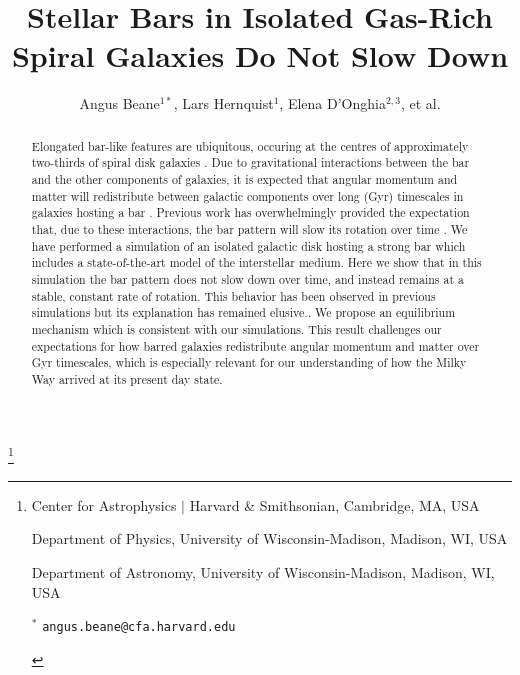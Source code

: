 \documentclass{natureprintstyle}
\title{Stellar Bars in Isolated Gas-Rich Spiral Galaxies Do Not Slow Down}
\author{Angus Beane$^{1*}$, Lars Hernquist$^1$, Elena D'Onghia$^{2,3}$, et al.}
\begin{document}
\maketitle

\let\thefootnote\relax\footnote{

\begin{affiliations}
\item Center for Astrophysics $|$ Harvard \& Smithsonian,  Cambridge, MA, USA

\item Department of Physics, University of Wisconsin-Madison, Madison, WI, USA

\item Department of Astronomy, University of Wisconsin-Madison, Madison, WI, USA

$^{*}$ \texttt{\mbox{angus.beane@cfa.harvard.edu}}

\end{affiliations}
}

\vspace{-3.5mm}
\begin{abstract}
  
  Elongated bar-like features are ubiquitous, occuring at the centres of
  approximately two-thirds of spiral disk galaxies \cite{2000AJ....119..536E,
  2007ApJ...657..790M}. Due to gravitational interactions between the bar and
  the other components of galaxies, it is expected that angular momentum and
  matter will redistribute between galactic components over long (Gyr)
  timescales in galaxies hosting a bar \cite{1972MNRAS.157....1L,
  1984MNRAS.209..729T, 1985MNRAS.213..451W}. Previous work has overwhelmingly
  provided the expectation that, due to these interactions, the bar pattern
  will slow its rotation over time \cite{1992ApJ...400...80H,
  2000ApJ...543..704D, 2002MNRAS.330...35A, 2002ApJ...569L..83A,
  2003MNRAS.341.1179A, 2003MNRAS.346..251O, 2005MNRAS.363..991H,
  2006ApJ...637..214M, 2007MNRAS.375..460W, 2009ApJ...697..293D}. We have
  performed a simulation of an isolated galactic disk hosting a strong bar
  which includes a state-of-the-art model of the interstellar medium. Here we
  show that in this simulation the bar pattern does not slow down over time,
  and instead remains at a stable, constant rate of rotation. This behavior
  has been observed in previous simulations but its explanation has remained
  elusive.\cite{1993AA...268...65F, 2010ApJ...719.1470V}. We propose an
  equilibrium mechanism which is consistent with our simulations. This result
  challenges our expectations for how barred galaxies redistribute angular
  momentum and matter over Gyr timescales, which is especially relevant for
  our understanding of how the Milky Way arrived at its present day state.
  
\end{abstract}
\end{document}
